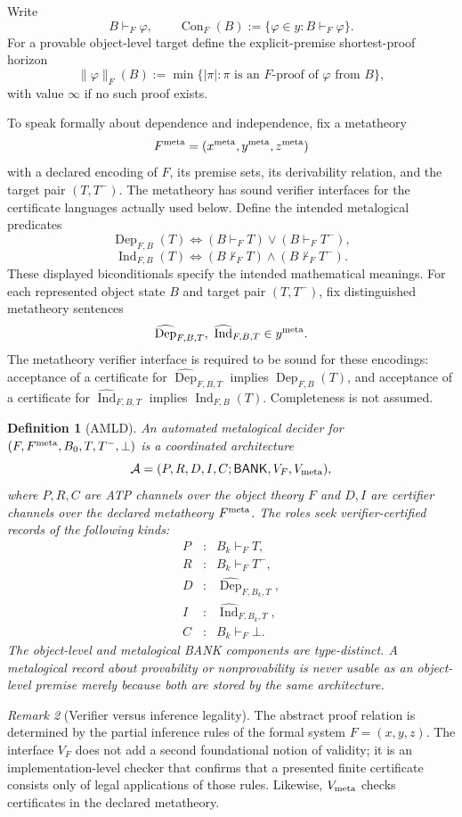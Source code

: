 \documentclass[11pt]{article}
\newtheorem{definition}{Definition}[section]
\theoremstyle{remark}
\newtheorem{remark}[definition]{Remark}
\newcommand{\Con}{\operatorname{Con}}
\newcommand{\Dep}{\operatorname{Dep}}
\newcommand{\Ind}{\operatorname{Ind}}
\begin{document}
Write
\[
B\vdash_F\varphi,
\qquad
\Con_F(B):=\{\varphi\in y:B\vdash_F\varphi\}.
\]
For a provable object-level target define the explicit-premise shortest-proof horizon
\[
\|\varphi\|_F(B):=\min\{|\pi|:\pi\text{ is an }F\text{-proof of }\varphi\text{ from }B\},
\]
with value $\infty$ if no such proof exists.

To speak formally about dependence and independence, fix a metatheory
\[
F^{\rm meta}=(x^{\rm meta},y^{\rm meta},z^{\rm meta})
\]
with a declared encoding of $F$, its premise sets, its derivability relation, and the target pair $(T,T^-)$. The metatheory has sound verifier interfaces for the certificate languages actually used below. Define the intended metalogical predicates
\[
\Dep_{F,B}(T)\iff (B\vdash_F T)\vee(B\vdash_F T^-),
\]
\[
\Ind_{F,B}(T)\iff (B\nvdash_F T)\wedge(B\nvdash_F T^-).
\]
These displayed biconditionals specify the intended mathematical meanings. For each represented object state $B$ and target pair $(T,T^-)$, fix distinguished metatheory sentences
\[
\widehat{\Dep}_{F,B,T},\ \widehat{\Ind}_{F,B,T}\in y^{\rm meta}.
\]
The metatheory verifier interface is required to be sound for these encodings: acceptance of a certificate for $\widehat{\Dep}_{F,B,T}$ implies $\Dep_{F,B}(T)$, and acceptance of a certificate for $\widehat{\Ind}_{F,B,T}$ implies $\Ind_{F,B}(T)$. Completeness is not assumed.

\begin{definition}[AMLD]
An \emph{automated metalogical decider} for $(F,F^{\rm meta},B_0,T,T^-,\bot)$ is a coordinated architecture
\[
\mathcal A=(P,R,D,I,C;\mathsf{BANK},V_F,V_{\rm meta}),
\]
where $P,R,C$ are ATP channels over the object theory $F$ and $D,I$ are certifier channels over the declared metatheory $F^{\rm meta}$. The roles seek verifier-certified records of the following kinds:
\[
\begin{array}{ccl}
P&:&B_k\vdash_F T,\\
R&:&B_k\vdash_F T^-,\\
D&:&\widehat{\Dep}_{F,B_k,T},\\
I&:&\widehat{\Ind}_{F,B_k,T},\\
C&:&B_k\vdash_F\bot.
\end{array}
\]
The object-level and metalogical BANK components are type-distinct. A metalogical record about provability or nonprovability is never usable as an object-level premise merely because both are stored by the same architecture.
\end{definition}

\begin{remark}[Verifier versus inference legality]
The abstract proof relation is determined by the partial inference rules of the formal system $F=(x,y,z)$. The interface $V_F$ does not add a second foundational notion of validity; it is an implementation-level checker that confirms that a presented finite certificate consists only of legal applications of those rules. Likewise, $V_{\rm meta}$ checks certificates in the declared metatheory.
\end{remark}
\end{document}
